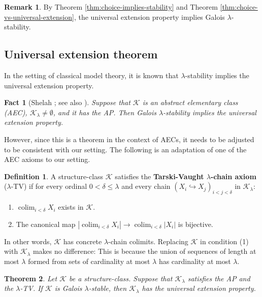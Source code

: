 \documentclass[10pt]{amsart}
\numberwithin{equation}{section}
\theoremstyle{plain}
\newtheorem{theorem}{Theorem}[section]
\newtheorem{fact}{Fact}
\theoremstyle{definition}
\newtheorem{definition}[theorem]{Definition}
\newtheorem*{remark}{Remark}
\DeclareMathOperator*{\colim}{colim}
\newcommand{\K}{\mathcal{K}}
\newcommand{\embed}{\hookrightarrow}
\begin{document}
\begin{remark}
By Theorem \ref{thm:choice-implies-stability} and Theorem \ref{thm:choice-vs-universal-extension}, the universal extension property implies Galois $\lambda$-stability.
\end{remark}


\subsection{Universal extension theorem}

In the setting of classical model theory, it is known that $\lambda$-stability implies the universal extension property.

\begin{fact}[{Shelah \cite[Claim II.1.16]{She09}}; see also {\cite[Chapter 10]{Bal09}}]\label{fact:Shelah-AEC}
Suppose that $\mathcal{K}$ is an abstract elementary class (AEC), $\K_\lambda\not=\emptyset$, and it has the AP.
Then Galois $\lambda$-stability implies the universal extension property.
\end{fact}

However, since this is a theorem in the context of AECs, it needs to be adjusted to be consistent with our setting.
The following is an adaptation of one of the AEC axioms to our setting.



\begin{definition}\label{def:TV}
A structure-class $\K$ satisfies the {\bf Tarski-Vaught $\lambda$-chain axiom} ($\lambda$-TV) if for every ordinal $0<\delta\leq\lambda$ and every chain $(X_i\embed X_j)_{i<j<\delta}$ in $\K_\lambda$:
\begin{enumerate}
\item $\colim_{i<\delta}X_i$ exists in $\K$.
\item The canonical map $|\colim_{i<\delta}X_i|\to\colim_{i<\delta}|X_i|$ is bijective.
\end{enumerate}
\end{definition}

In other words, $\K$ has concrete $\lambda$-chain colimits.
Replacing $\K$ in condition (1) with $\K_\lambda$ makes no difference:
This is because the union of sequences of length at most $\lambda$ formed from sets of cardinality at most $\lambda$ has cardinality at most $\lambda$.




\begin{theorem}\label{thm:Shelah-AEC}
Let $\K$ be a structure-class.
Suppose that $\K_\lambda$ satisfies the AP and the $\lambda$-TV.
If $\K$ is Galois $\lambda$-stable, then $\K_\lambda$ has the universal extension property.
\end{theorem}
\end{document}
